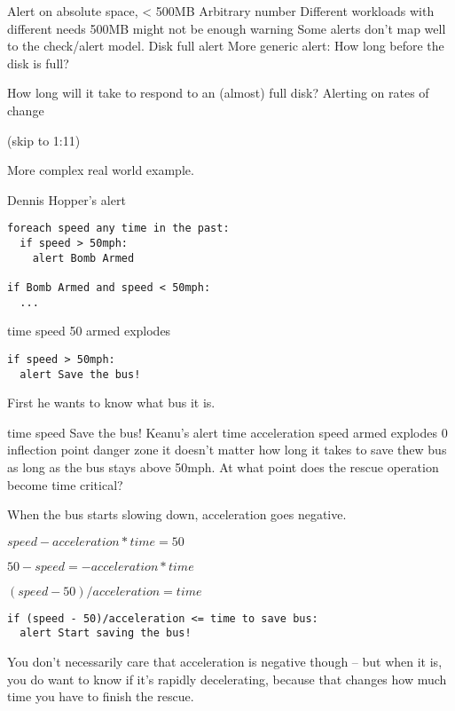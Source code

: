 \documentclass[online,12pt,helvetica]{chaksem}
\begin{document}
Alert on absolute space, < 500MB
Arbitrary number
Different workloads with different needs 500MB might not be enough warning
Some alerts don't map well to the check/alert model.
Disk full alert
More generic alert:
How long before the disk is full?

How long will it take to respond to an (almost) full disk?
Alerting on rates of change 







(skip to 1:11)

More complex real world example.


Dennis Hopper's alert
\begin{verbatim}
foreach speed any time in the past:
  if speed > 50mph:
	alert Bomb Armed

if Bomb Armed and speed < 50mph:
  ...
\end{verbatim}

time
speed
50
armed
explodes
\begin{slide}
\begin{verbatim}
if speed > 50mph:
  alert Save the bus!
\end{verbatim}
First he wants to know what bus it is.
\end{slide}
time
speed
Save the bus!
Keanu's alert
time
acceleration
speed
armed
explodes
0
inflection point
danger zone
it doesn't matter how long it takes to save thew bus as long as the bus stays above 50mph.  At what point does the rescue operation become time critical?

When the bus starts slowing down, acceleration goes negative.
\begin{slide}

$speed - acceleration * time = 50$

$50 - speed = - acceleration * time$

$(speed - 50)/acceleration = time$


\begin{verbatim}
if (speed - 50)/acceleration <= time to save bus:
  alert Start saving the bus!
\end{verbatim}
\end{slide}

You don't necessarily care that acceleration is negative though -- but when it is, you do want to know if it's rapidly decelerating, because that changes how much time you have to finish the rescue.
\end{document}
